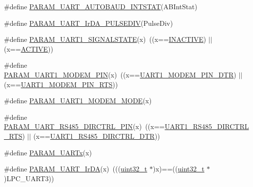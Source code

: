\begin{DoxyCompactItemize}
\#define \hyperlink{group___u_a_r_t___private___macros_ga7ef8955bcb3b2f1afc20d1962f85c290}{P\+A\+R\+A\+M\+\_\+\+U\+A\+R\+T\+\_\+\+A\+U\+T\+O\+B\+A\+U\+D\+\_\+\+I\+N\+T\+S\+T\+AT}(A\+B\+Int\+Stat)
\item 
\#define \hyperlink{group___u_a_r_t___private___macros_ga7e6f9366830e7a44be2008e1f2e03399}{P\+A\+R\+A\+M\+\_\+\+U\+A\+R\+T\+\_\+\+Ir\+D\+A\+\_\+\+P\+U\+L\+S\+E\+D\+IV}(Pulse\+Div)
\item 
\#define \hyperlink{group___u_a_r_t___private___macros_ga3d9adf3640fa108cc794e5edf140e95f}{P\+A\+R\+A\+M\+\_\+\+U\+A\+R\+T1\+\_\+\+S\+I\+G\+N\+A\+L\+S\+T\+A\+TE}(x)~((x==\hyperlink{group___u_a_r_t___public___types_ggada493f726a4ea247b209b49fb8c85a52a3ff8ba88da6f8947ab7c22b7825c6bb6}{I\+N\+A\+C\+T\+I\+VE}) $\vert$$\vert$ (x==\hyperlink{group___u_a_r_t___public___types_ggada493f726a4ea247b209b49fb8c85a52a33cf1d8ef1d06ee698a7fabf40eb3a7f}{A\+C\+T\+I\+VE}))
\item 
\#define \hyperlink{group___u_a_r_t___private___macros_gae46654a5c2b0b2b3022c2633c4d12fc2}{P\+A\+R\+A\+M\+\_\+\+U\+A\+R\+T1\+\_\+\+M\+O\+D\+E\+M\+\_\+\+P\+IN}(x)~((x==\hyperlink{group___u_a_r_t___public___types_ggabfc7ec239b7d598e6a2cc163e66b76fcac831b7aff6c92cfb78dab2a0bf6bd97c}{U\+A\+R\+T1\+\_\+\+M\+O\+D\+E\+M\+\_\+\+P\+I\+N\+\_\+\+D\+TR}) $\vert$$\vert$ (x==\hyperlink{group___u_a_r_t___public___types_ggabfc7ec239b7d598e6a2cc163e66b76fcafb10c5304a783fa1d234d72a9d1ff056}{U\+A\+R\+T1\+\_\+\+M\+O\+D\+E\+M\+\_\+\+P\+I\+N\+\_\+\+R\+TS}))
\item 
\#define \hyperlink{group___u_a_r_t___private___macros_ga0e22549db0a3e5945249b23ae87eebbf}{P\+A\+R\+A\+M\+\_\+\+U\+A\+R\+T1\+\_\+\+M\+O\+D\+E\+M\+\_\+\+M\+O\+DE}(x)
\item 
\#define \hyperlink{group___u_a_r_t___private___macros_ga32e9aa7d2b33ee9fe74da664e2359b64}{P\+A\+R\+A\+M\+\_\+\+U\+A\+R\+T\+\_\+\+R\+S485\+\_\+\+D\+I\+R\+C\+T\+R\+L\+\_\+\+P\+IN}(x)~((x==\hyperlink{group___u_a_r_t___public___types_ggabcfaaf12f325112107ff9b5c5cf1120ca8f2c8ec98f2fb7e26516974a08fc2885}{U\+A\+R\+T1\+\_\+\+R\+S485\+\_\+\+D\+I\+R\+C\+T\+R\+L\+\_\+\+R\+TS}) $\vert$$\vert$ (x==\hyperlink{group___u_a_r_t___public___types_ggabcfaaf12f325112107ff9b5c5cf1120cad58cd4cd834d89b139816c0cd3138582}{U\+A\+R\+T1\+\_\+\+R\+S485\+\_\+\+D\+I\+R\+C\+T\+R\+L\+\_\+\+D\+TR}))
\item 
\#define \hyperlink{group___u_a_r_t___private___macros_ga154a081172d66e30febec60c3833ca54}{P\+A\+R\+A\+M\+\_\+\+U\+A\+R\+Tx}(x)
\item 
\#define \hyperlink{group___u_a_r_t___private___macros_ga8af9d466136018be41f1d1280c11197a}{P\+A\+R\+A\+M\+\_\+\+U\+A\+R\+T\+\_\+\+Ir\+DA}(x)~(((\hyperlink{_p_e___types_8h_a33594304e786b158f3fb30289278f5af}{uint32\+\_\+t} $\ast$)x)==((\hyperlink{_p_e___types_8h_a33594304e786b158f3fb30289278f5af}{uint32\+\_\+t} $\ast$)L\+P\+C\+\_\+\+U\+A\+R\+T3))
$$
\end{DoxyCompactItemize}
